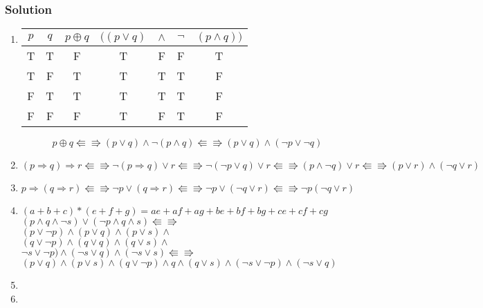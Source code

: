 \subsubsection*{Solution}
\begin{enumerate}
	\item \hspace{1em}
	\begin{center}
		\begin{tabular}{cc|c|cccc}
		$p$ & $q$ & $p \oplus q$ & $((p\lor q)$ &$\land$&$\neg$&$(p \land q))$\\
		\hline
		T&T&F&T&F&F&T\\
		T&F&T&T&T&T&F\\
		F&T&T&T&T&T&F\\
		F&F&F&T&F&T&F\\
		\end{tabular}
	\end{center}
$$p \oplus q  \Lleftarrow\!\!\!\!\Rrightarrow (p\lor q)\land\neg (p \land q) \Lleftarrow\!\!\!\!\Rrightarrow (p\lor q)\land (\neg p\lor \neg q)$$
	
	\item \hspace{1em}
	
$$ (p \Rightarrow q) \Rightarrow r \Lleftarrow\!\!\!\!\Rrightarrow \neg(p \Rightarrow q) \lor r \Lleftarrow\!\!\!\!\Rrightarrow \neg (\neg p \lor q ) \lor r \Lleftarrow\!\!\!\!\Rrightarrow (p \land \neg q) \lor r \Lleftarrow\!\!\!\!\Rrightarrow (p \lor r) \land (\neg q \lor r)$$ 
	\item \hspace{1em}
	
$$ p \Rightarrow (q \Rightarrow r) \Lleftarrow\!\!\!\!\Rrightarrow \neg p \lor (q \Rightarrow r) \Lleftarrow\!\!\!\!\Rrightarrow \neg p \lor (\neg q \lor r) \Lleftarrow\!\!\!\!\Rrightarrow \neg p (\neg q \lor r) $$ 
	\item \hspace{1em}
	
\begin{flushright}
$(a + b + c) * (e + f + g) = ae + af + ag + be + bf + bg + ce + cf + cg$\\
$(p \land q \land \neg s)\lor (\neg p \land q \land s) \Lleftarrow\!\!\!\!\Rrightarrow$\\
$(p \lor \neg p) \land (p \lor q) \land (p \lor s) \land$\\
$(q \lor \neg p) \land (q \lor q) \land (q \lor s) \land$\\
$\neg s \lor \neg p) \land (\neg s \lor q) \land (\neg s \lor s) \Lleftarrow\!\!\!\!\Rrightarrow$\\
$(p\lor q) \land ( p\lor s) \land (q\lor \neg p)\land q \land (q\lor s)\land (\neg s\lor \neg p ) \land (\neg s \lor q)$\\

\end{flushright}
	\item \hspace{1em}
	

	\item \hspace{1em}
	

\end{enumerate}

